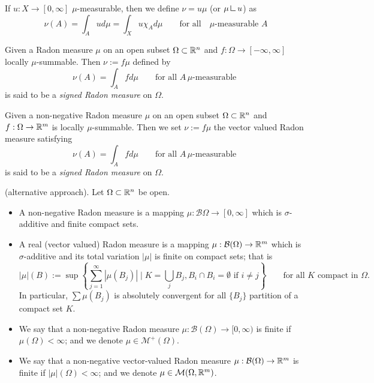 \begin{definition}
If $u : X \to [0,\infty]$ $\mu$-measurable, then we define $\nu = u \mu$ (or
$\mu \mres u$) as 
\[
\nu(A) = \int_A u d\mu = \int_X u \chi_A d\mu 
\qquad \text{for all} \quad  \mu\text{-measurable } A
\]
\end{definition}

\begin{definition}
Given a Radon measure $\mu$ on an open subset $\Omega \subset \mathbb{R}^n$ and $f: \Omega \to
[-\infty,\infty]$ locally $\mu$-summable. Then $\nu := f \mu$ defined by
\[
\nu(A) = \int_A f d\mu 
\qquad \text{for all }  A \, \mu\text{-measurable }
\]
is said to be a \emph{signed Radon measure} on $\Omega$.
\end{definition}

\begin{definition}
Given a non-negative Radon measure $\mu$ on an open subset $\Omega \subset \mathbb{R}^n$ and $f: \Omega \to
\mathbb{R}^m$ is locally $\mu$-summable. Then we set $\nu := f \mu$ the vector valued
Radon measure satisfying
\[
\nu(A) = \int_A f d\mu 
\qquad \text{for all }  A \, \mu\text{-measurable }
\]
is said to be a \emph{signed Radon measure} on $\Omega$.
\end{definition}

\begin{definition}(alternative approach). Let $\Omega \subset \mathbb{R}^n$ be open.
\begin{itemize}
\item A non-negative Radon measure is a mapping $\mu : \mathcal{B}{\Omega} \to
[0,\infty]$ which is $\sigma$-additive and finite compact sets.
\item A real (vector valued) Radon measure is a mapping $\mu :
\mathcal{B}(\Omega) \to \mathbb{R}^m$ which is $\sigma$-additive and its total variation
$|\mu|$ is finite on compact sets; that is
\[
|\mu|(B) := \sup \left\{
\sum_{j=1}^\infty |\mu(B_j)| \mid K = \bigcup_{j} B_j, B_i \cap B_i = \emptyset
\text{ if } i\neq j
\right\}
\qquad \text{for all $K$ compact in $\Omega$}.
\]
In particular, $\sum \mu(B_j)$ is absolutely convergent for all $\{B_j\}$
partition of a compact set $K$.
\item We say that a non-negative Radon measure $\mu : \mathcal{B}(\Omega) \to
[0,\infty)$ is finite if $\mu(\Omega) < \infty$; and we denote $\mu \in
\mathcal{M}^+(\Omega)$.
\item We say that a non-negative vector-valued Radon measure $\mu : \mathcal{B}(\Omega) \to
\mathbb{R}^m$ is finite if $|\mu|(\Omega) < \infty$; and we denote $\mu \in
\mathcal{M}(\Omega,\mathbb{R}^m)$.
\end{itemize}
\end{definition}

